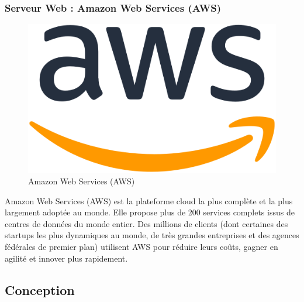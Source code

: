 \subsubsection{Serveur Web : Amazon Web Services (AWS)}
\begin{figure}[h]
	\includegraphics[scale=0.3]{./Template LaTeX/Images/512px-Amazon_Web_Services_Logo.svg.png}
	\centering
	\caption{Amazon Web Services (AWS)}
\end{figure}
Amazon Web Services (AWS) est la plateforme cloud la plus complète et la plus largement adoptée au monde. Elle propose plus de 200 services complets issus de centres de données du monde entier. Des millions de clients (dont certaines des startups les plus dynamiques au monde, de très grandes entreprises et des agences fédérales de premier plan) utilisent AWS pour réduire leurs coûts, gagner en agilité et innover plus rapidement.

\subsection{Conception}
